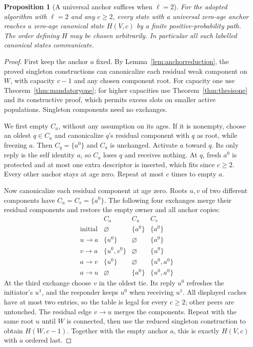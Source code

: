 \documentclass[11pt]{article}
\newtheorem{proposition}[theorem]{Proposition}
\begin{document}
\begin{proposition}[A universal anchor suffices when $\ell=2$]
\label{prop:anchorcanonical}
For the adopted algorithm with $\ell=2$ and any $c\ge2$,
every state with a universal zero-age anchor reaches a
zero-age canonical state $H(V,c)$ by a finite
positive-probability path. The order defining $H$ may be
chosen arbitrarily. In particular all such labelled
canonical states communicate.
\end{proposition}
\begin{proof}
First keep the anchor $a$ fixed. By
Lemma~\ref{lem:anchorreduction}, the proved singleton
constructions can canonicalize each residual weak component
on $W$, with capacity $c-1$ and any chosen component root.
For capacity one use Theorem~\ref{thm:mandatoryone}; for
higher capacities use Theorem~\ref{thm:thesisone} and its
constructive proof, which permits excess slots on smaller
active populations. Singleton components need no exchanges.

We first empty $C_a$, without any assumption on its ages.
If it is nonempty, choose an oldest $q\in C_a$ and
canonicalize $q$'s residual component with $q$ as root,
while freezing $a$. Then $C_q=\{a^0\}$ and $C_a$ is
unchanged. Activate $a$ toward $q$. Its only reply is the
self identity $a$, so $C_a$ loses $q$ and receives nothing.
At $q$, fresh $a^0$ is protected and at most one extra
descriptor is inserted, which fits since $c\ge2$.
Every other anchor stays at age zero. Repeat at most $c$
times to empty $a$.

Now canonicalize each residual component at age zero.
Roots $u,v$ of two different components have
$C_u=C_v=\{a^0\}$. The following four exchanges merge
their residual components and restore the empty owner and
all anchor copies:
\[
\begin{array}{c|ccc}
 &C_a&C_u&C_v\\\hline
 \text{initial}&\varnothing&\{a^0\}&\{a^0\}\\
 u\to a&\{u^0\}&\varnothing&\{a^0\}\\
 v\to a&\{u^0,v^0\}&\varnothing&\{u^0\}\\
 a\to v&\{u^0\}&\varnothing&\{u^0,a^0\}\\
 a\to u&\varnothing&\{a^0\}&\{u^0,a^0\}
\end{array}
\]
At the third exchange choose $v$ in the oldest tie.
Its reply $u^0$ refreshes the initiator's $u^1$, and
the responder keeps $u^0$ when receiving $u^1$.
All displayed caches have at most two entries, so the
table is legal for every $c\ge2$; other peers are untouched.
The residual edge $v\to u$ merges the components.
Repeat with the same root $u$ until $W$ is connected,
then use the reduced singleton construction to obtain
$H(W,c-1)$. Together with the empty anchor $a$, this is
exactly $H(V,c)$ with $a$ ordered last.


\end{proof}
\end{document}
